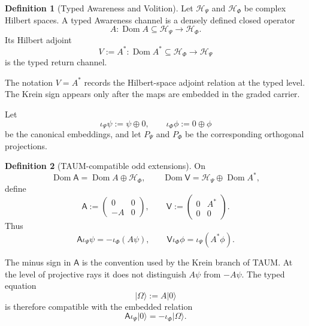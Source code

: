 \documentclass[11pt,reqno]{scrartcl}
\newcommand{\scrHP}{\mathscr H_{\Psi}}
\newcommand{\scrHF}{\mathscr H_{\Phi}}
\newcommand{\PP}{P_{\Psi}}
\newcommand{\PF}{P_{\Phi}}
\newcommand{\Aodd}{\mathsf A}
\newcommand{\Vodd}{\mathsf V}
\newcommand{\iP}{\iota_{\Psi}}
\newcommand{\iF}{\iota_{\Phi}}
\newcommand{\ket}[1]{\lvert #1\rangle}
\DeclareMathOperator{\Dom}{Dom}
\theoremstyle{plain}
\theoremstyle{definition}
\newtheorem{definition}[definition]{Definition}
\theoremstyle{remark}
\begin{document}
\begin{definition}[Typed Awareness and Volition]
\label{def:typed-AV}
Let \(\scrHP\) and \(\scrHF\) be complex Hilbert spaces.  A typed Awareness
channel is a densely defined closed operator
\begin{equation}
  A:\Dom A\subseteq\scrHP\longrightarrow\scrHF.
  \label{eq:typed-A}
\end{equation}
Its Hilbert adjoint
\begin{equation}
  V:=A^*:\Dom A^*\subseteq\scrHF\longrightarrow\scrHP
  \label{eq:typed-V}
\end{equation}
is the typed return channel.
\end{definition}

The notation \(V=A^*\) records the Hilbert-space adjoint relation at the typed
level.  The Krein sign appears only after the maps are embedded in the graded
carrier.

Let
\begin{equation}
  \iP\psi:=\psi\oplus0,
  \qquad
  \iF\phi:=0\oplus\phi
  \label{eq:embeddings}
\end{equation}
be the canonical embeddings, and let \(\PP\) and \(\PF\) be the corresponding
orthogonal projections.

\begin{definition}[TAUM-compatible odd extensions]
\label{def:odd-extensions}
On
\begin{equation}
  \Dom\Aodd=\Dom A\oplus\scrHF,
  \qquad
  \Dom\Vodd=\scrHP\oplus\Dom A^*,
\end{equation}
define
\begin{equation}
  \Aodd
  :=\begin{pmatrix}0&0\\-A&0\end{pmatrix},
  \qquad
  \Vodd
  :=\begin{pmatrix}0&A^*\\0&0\end{pmatrix}.
  \label{eq:odd-extensions}
\end{equation}
Thus
\begin{equation}
  \Aodd\iP\psi=-\iF(A\psi),
  \qquad
  \Vodd\iF\phi=\iP(A^*\phi).
  \label{eq:odd-action}
\end{equation}
\end{definition}

The minus sign in \(\Aodd\) is the convention used by the Krein branch of
TAUM.  At the level of projective rays it does not distinguish
\(A\psi\) from \(-A\psi\).  The typed equation
\begin{equation}
  \ket\Omega:=A\ket0
  \label{eq:typed-Omega}
\end{equation}
is therefore compatible with the embedded relation
\begin{equation}
  \Aodd\iP\ket0=-\iF\ket\Omega.
  \label{eq:embedded-Omega}
\end{equation}
\end{document}
